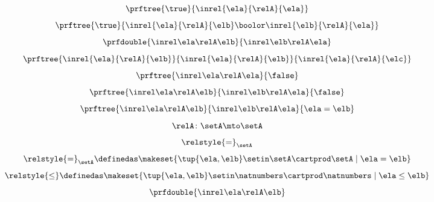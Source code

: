 \begin{forslides}
 \begin{equation}\label{eq:slides_session2_139}
\prftree{\true}{\inrel{\ela}{\relA}{\ela}}
\end{equation}
\begin{equation}\label{eq:slides_session2_140}
\prftree{\true}{\inrel{\ela}{\relA}{\elb} \boolor \inrel{\elb}{\relA}{\ela}}
\end{equation}
 \begin{equation}\label{eq:slides_session2_141}
\prfdouble{
            \inrel \ela \relA \elb
        }{
            \inrel \elb \relA \ela
        }
\end{equation}
\begin{equation}\label{eq:slides_session2_142}
\prftree{\inrel{\ela}{\relA}{\elb}}{\inrel{\ela}{\relA}{\elb}}{\inrel{\ela}{\relA}{\elc}}
\end{equation}
 \begin{equation}\label{eq:slides_session2_143}
\prftree{
            \inrel \ela \relA \ela
        }{
            \false
        }
\end{equation}
\begin{equation}\label{eq:slides_session2_144}
\prftree{
            \inrel \ela \relA \elb
        }{
            \inrel \elb \relA \ela
        }{
            \false
        }
\end{equation}
 \begin{equation}\label{eq:slides_session2_145}
\prftree{
            \inrel \ela \relA \elb
        }{
            \inrel \elb \relA \ela
        }{
            \ela = \elb
        }
\end{equation}
\begin{equation}\label{eq:slides_session2_146}
\relA\colon \setA \mto \setA
\end{equation}
 \begin{equation}\label{eq:slides_session2_147}
\relstyle{=}_\setA
\end{equation}
\begin{equation}\label{eq:slides_session2_148}
\relstyle{=}_\setA \definedas \makeset{\tup{\ela,\elb}\setin \setA\cartprod \setA \mid \ela=\elb}
\end{equation}
 \begin{equation}\label{eq:slides_session2_149}
\relstyle{\leq} \definedas  \makeset{\tup{\ela,\elb}\setin \natnumbers\cartprod \natnumbers\mid \ela \leq \elb}
\end{equation}
\begin{equation}\label{eq:slides_session2_150}
\prfdouble{
            \inrel \ela \relA \elb
}
\end{equation}
\end{forslides}
